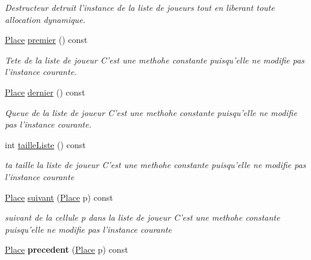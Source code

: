 \begin{DoxyCompactItemize}
\begin{DoxyCompactList}\small\item\em \-Destructeur detruit l'instance de la liste de joueurs tout en liberant toute allocation dynamique. \end{DoxyCompactList}\item 
\hyperlink{class_cell}{\-Place} \hyperlink{class_liste_a0d57237d194d7f97a48bf2003e643d34}{premier} () const 
\begin{DoxyCompactList}\small\item\em \-Tete de la liste de joueur \-C'est une methohe constante puisqu'elle ne modifie pas l'instance courante. \end{DoxyCompactList}\item 
\hyperlink{class_cell}{\-Place} \hyperlink{class_liste_a7a8f100182324187f16eb603286b8362}{dernier} () const 
\begin{DoxyCompactList}\small\item\em \-Queue de la liste de joueur \-C'est une methohe constante puisqu'elle ne modifie pas l'instance courante. \end{DoxyCompactList}\item 
int \hyperlink{class_liste_a2e1fee9d6e2020048c14fed1328b1768}{taille\-Liste} () const 
\begin{DoxyCompactList}\small\item\em ta taille la liste de joueur \-C'est une methohe constante puisqu'elle ne modifie pas l'instance courante \end{DoxyCompactList}\item 
\hyperlink{class_cell}{\-Place} \hyperlink{class_liste_a526d7aa1c8d59a697780577df75f1485}{suivant} (\hyperlink{class_cell}{\-Place} p) const 
\begin{DoxyCompactList}\small\item\em suivant de la cellule p dans la liste de joueur \-C'est une methohe constante puisqu'elle ne modifie pas l'instance courante \end{DoxyCompactList}\item 
\hypertarget{class_liste_a0061fbf6df34aa58a2a9a4bff41c0a2b}{\hyperlink{class_cell}{\-Place} {\bfseries precedent} (\hyperlink{class_cell}{\-Place} p) const }\label{class_liste_a0061fbf6df34aa58a2a9a4bff41c0a2b}


\end{DoxyCompactItemize}
